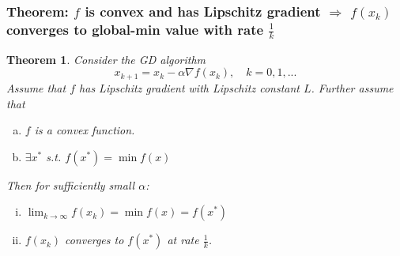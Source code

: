 \documentclass[11pt,a4paper]{article}
\newtheorem{theorem}{Theorem}
\begin{document}
\subsubsection{Theorem: $f$ is convex and has Lipschitz gradient $\Rightarrow$ $f(x_k)$ converges to global-min value with rate $\frac{1}{k}$}
\begin{theorem}
Consider the GD algorithm $$x_{k+1}=x_k-\alpha \nabla f(x_k),\quad k=0,1,...$$
Assume that $f$ has Lipschitz gradient with Lipschitz constant $L$. Further assume that
\begin{enumerate}[(a)]
    \item $f$ is a convex function.
    \item $\exists x^*$ s.t. $f(x^*)=\min f(x)$
\end{enumerate}
Then for sufficiently small $\alpha$:
\begin{enumerate}[(i)]
    \item $\lim_{k \rightarrow \infty} f(x_k)=\min f(x)=f(x^*)$
    \item $f(x_k)$ converges to $f(x^*)$ at rate $\frac{1}{k}$.
\end{enumerate}
\end{theorem}
\end{document}

